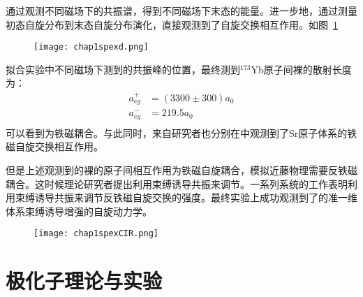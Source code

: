 通过观测不同磁场下的共振谱，得到不同磁场下末态的能量。进一步地，通过测量初态自旋分布到末态自旋分布演化\cite{scazza2014observation,cappellini2014direct}，直接观测到了自旋交换相互作用。如图~\ref{egd}~
\begin{figure}[!htbp]
    \centering
    \texttt{[image: chap1spexd.png]}
    \label{egd}
\end{figure}
拟合实验中不同磁场下测到的共振峰的位置，最终测到${}^{173}$Yb原子间裸的散射长度为\cite{scazza2014observation,cappellini2014direct}：
\begin{equation}
\begin{split}
a_{e g}^{+}&=(3300 \pm 300) a_{0}\\
a_{e g}^{-}& = 219.5 a_0\\
\end{split}
\end{equation}
可以看到为铁磁耦合。与此同时，来自研究者也分别在中观测到了Sr原子体系的铁磁自旋交换相互作用\cite{zhang2014spectroscopic}。

但是上述观测到的裸的原子间相互作用为铁磁自旋耦合，模拟近藤物理需要反铁磁耦合。这时候理论研究者提出利用束缚诱导共振来调节。一系列系统的工作表明利用束缚诱导共振来调节反铁磁自旋交换的强度\cite{zhang2016kondo,cheng2017enhancing,zhang2018control,ji2018confinement,zhang2020tight,zhang2020controlling}。最终实验上成功观测到了的准一维体系束缚诱导增强的自旋动力学\cite{riegger2018localized}。
\begin{figure}[!htbp]
    \centering
    \texttt{[image: chap1spexCIR.png]}
    \label{CIRspexexp}
\end{figure}


\section{极化子理论与实验}


